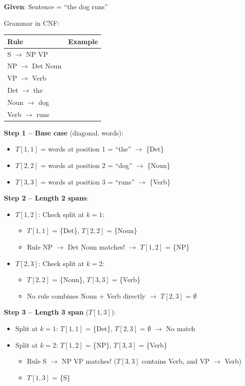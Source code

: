 \documentclass[11pt,a4paper]{article}
\begin{document}
\begin{tcolorbox}[colback=green!5!white,colframe=green!75!black,title=\textbf{Worked Example 27: CKY Parsing Table Construction}]
\textbf{Given}: Sentence = ``the dog runs''

Grammar in CNF:
\begin{center}
\begin{tabular}{|l|l|}
\hline
\textbf{Rule} & \textbf{Example} \\ \hline
S $\to$ NP VP & \\ \hline
NP $\to$ Det Noun & \\ \hline
VP $\to$ Verb & \\ \hline
Det $\to$ the & \\ \hline
Noun $\to$ dog & \\ \hline
Verb $\to$ runs & \\ \hline
\end{tabular}
\end{center}

\textbf{Step 1 -- Base case} (diagonal, words):
\begin{itemize}
    \item $T[1,1]$ = words at position 1 = ``the'' $\to$ \{Det\}
    \item $T[2,2]$ = words at position 2 = ``dog'' $\to$ \{Noun\}
    \item $T[3,3]$ = words at position 3 = ``runs'' $\to$ \{Verb\}
\end{itemize}

\textbf{Step 2 -- Length 2 spans}:
\begin{itemize}
    \item $T[1,2]$: Check split at $k=1$:
    \begin{itemize}
        \item $T[1,1]$ = \{Det\}, $T[2,2]$ = \{Noun\}
        \item Rule NP $\to$ Det Noun matches! $\to$ $T[1,2]$ = \{NP\}
    \end{itemize}
    \item $T[2,3]$: Check split at $k=2$:
    \begin{itemize}
        \item $T[2,2]$ = \{Noun\}, $T[3,3]$ = \{Verb\}
        \item No rule combines Noun + Verb directly $\to$ $T[2,3]$ = $\emptyset$
    \end{itemize}
\end{itemize}

\textbf{Step 3 -- Length 3 span} ($T[1,3]$):
\begin{itemize}
    \item Split at $k=1$: $T[1,1]$ = \{Det\}, $T[2,3]$ = $\emptyset$ $\to$ No match
    \item Split at $k=2$: $T[1,2]$ = \{NP\}, $T[3,3]$ = \{Verb\}
    \begin{itemize}
        \item Rule S $\to$ NP VP matches! ($T[3,3]$ contains Verb, and VP $\to$ Verb)
        \item $T[1,3]$ = \{S\}
    \end{itemize}
\end{itemize}


\end{tcolorbox}
\end{document}
